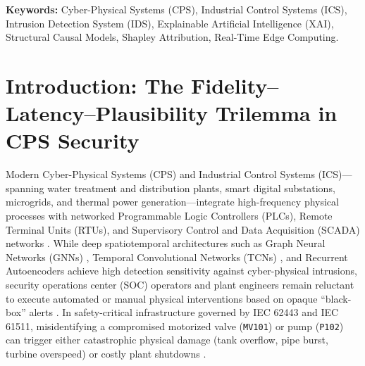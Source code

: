 \documentclass[10pt,a4paper]{article}
\begin{document}
\begin{abstract}
on an ARM Cortex-A72 edge profile ($12.1\times\text{--}15.5\times$ faster than ShaTS and KernelSHAP), achieving a $93.2\%\text{--}100\%$ hard $10\text{ ms}$ deadline compliance rate.
\end{abstract}

\noindent\textbf{Keywords:} Cyber-Physical Systems (CPS), Industrial Control Systems (ICS), Intrusion Detection System (IDS), Explainable Artificial Intelligence (XAI), Structural Causal Models, Shapley Attribution, Real-Time Edge Computing.

\section{Introduction: The Fidelity--Latency--Plausibility Trilemma in CPS Security}

Modern Cyber-Physical Systems (CPS) and Industrial Control Systems (ICS)---spanning water treatment and distribution plants, smart digital substations, microgrids, and thermal power generation---integrate high-frequency physical processes with networked Programmable Logic Controllers (PLCs), Remote Terminal Units (RTUs), and Supervisory Control and Data Acquisition (SCADA) networks \cite{deng2021gdn, skrodelis2026review}. While deep spatiotemporal architectures such as Graph Neural Networks (GNNs) \cite{deng2021gdn, tang2023grn}, Temporal Convolutional Networks (TCNs) \cite{abudurexiti2025cctak}, and Recurrent Autoencoders \cite{huong2022fedex, birihanu2024correlation} achieve high detection sensitivity against cyber-physical intrusions, security operations center (SOC) operators and plant engineers remain reluctant to execute automated or manual physical interventions based on opaque ``black-box'' alerts \cite{fung2024ndss, oinonen2026epsr}. In safety-critical infrastructure governed by IEC 62443 and IEC 61511, misidentifying a compromised motorized valve (\texttt{MV101}) or pump (\texttt{P102}) can trigger either catastrophic physical damage (tank overflow, pipe burst, turbine overspeed) or costly plant shutdowns \cite{rasheed2026xaicps, panesar2026mmd}.
\end{document}
